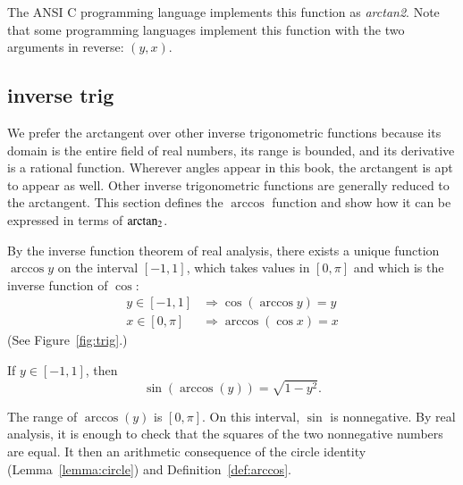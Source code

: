 The ANSI C programming language implements this function as {\it
  arctan2}.  Note that some programming languages implement this
function with the two arguments in reverse: $(y,x)$.
%
%
%
%


\subsection{inverse trig}
%

We prefer the arctangent over other inverse trigonometric functions
because its domain is the entire field of real numbers, its range is
bounded, and its derivative is a rational function.  Wherever angles
appear in this book, the arctangent is apt to appear as well.  Other
inverse trigonometric functions are generally  reduced to the
arctangent.  This section defines the $\arccos$ function and show how
it can be expressed in terms of ${\operatorname{arctan_2}}$.

\begin{definition}[arccos]
\label{def:arccos}
  By the inverse function theorem of real
    analysis, there exists a unique function $\arccos y$ on the
  interval $[-1,1]$, which takes values in $[0,\pi]$ and which is the
  inverse function of $\cos$:
\begin{align*}
y\in [-1,1] &\Rightarrow \cos(\arccos y) = y\\
x\in[0,\pi] &\Rightarrow \arccos(\cos x) = x
\end{align*}
%
%
(See Figure~\ref{fig:trig}.)
\end{definition}


\begin{lemma}[]\label{lemma:sin-arccos}
  If $y\in[-1,1]$, then
\[ \sin(\arccos(y)) = \sqrt{1-y^2}.\] 
\end{lemma}

\begin{proved}
  The range of $\arccos(y)$ is $[0,\pi]$.  On
  this interval, $\sin$ is nonnegative.  By
  real analysis, it is enough to check that
  the squares of the two nonnegative numbers are equal.  It then an
  arithmetic consequence of the circle identity
  (Lemma~\ref{lemma:circle}) and Definition~\ref{def:arccos}.
  \swallowed\end{proved}

